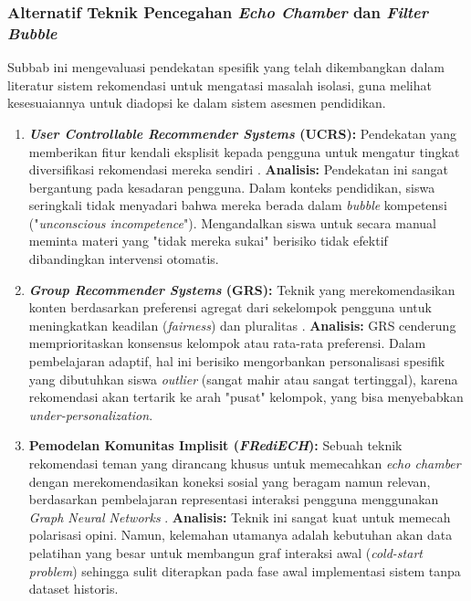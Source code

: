 \subsubsection{Alternatif Teknik Pencegahan \textit{Echo Chamber} dan \textit{Filter Bubble}}
\label{sssec:alternatif_pencegahan_bubble}
Subbab ini mengevaluasi pendekatan spesifik yang telah dikembangkan dalam literatur sistem rekomendasi untuk mengatasi masalah isolasi, guna melihat kesesuaiannya untuk diadopsi ke dalam sistem asesmen pendidikan.

\begin{enumerate}
    \item \textbf{\textit{User Controllable Recommender Systems} (UCRS):}
    Pendekatan yang memberikan fitur kendali eksplisit kepada pengguna untuk mengatur tingkat diversifikasi rekomendasi mereka sendiri \autocite{Wang2022}.
    \textbf{Analisis:} Pendekatan ini sangat bergantung pada kesadaran pengguna. Dalam konteks pendidikan, siswa seringkali tidak menyadari bahwa mereka berada dalam \textit{bubble} kompetensi ("\textit{unconscious incompetence}"). Mengandalkan siswa untuk secara manual meminta materi yang "tidak mereka sukai" berisiko tidak efektif dibandingkan intervensi otomatis.

    \item \textbf{\textit{Group Recommender Systems} (GRS):}
    Teknik yang merekomendasikan konten berdasarkan preferensi agregat dari sekelompok pengguna untuk meningkatkan keadilan (\textit{fairness}) dan pluralitas \autocite{Dokoupil2022}.
    \textbf{Analisis:} GRS cenderung memprioritaskan konsensus kelompok atau rata-rata preferensi. Dalam pembelajaran adaptif, hal ini berisiko mengorbankan personalisasi spesifik yang dibutuhkan siswa \textit{outlier} (sangat mahir atau sangat tertinggal), karena rekomendasi akan tertarik ke arah "pusat" kelompok, yang bisa menyebabkan \textit{under-personalization}.

    \item \textbf{Pemodelan Komunitas Implisit (\textit{FRediECH}):}
    Sebuah teknik rekomendasi teman yang dirancang khusus untuk memecahkan \textit{echo chamber} dengan merekomendasikan koneksi sosial yang beragam namun relevan, berdasarkan pembelajaran representasi interaksi pengguna menggunakan \textit{Graph Neural Networks} \autocite{Tommasel2021}.
    \textbf{Analisis:} Teknik ini sangat kuat untuk memecah polarisasi opini. Namun, kelemahan utamanya adalah kebutuhan akan data pelatihan yang besar untuk membangun graf interaksi awal (\textit{cold-start problem}) sehingga sulit diterapkan pada fase awal implementasi sistem tanpa dataset historis.


\end{enumerate}
